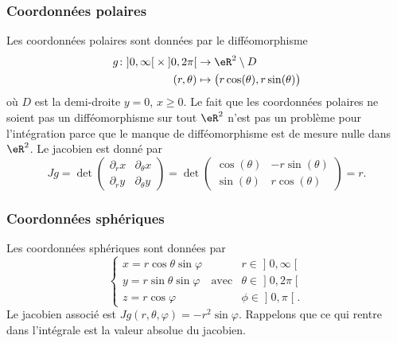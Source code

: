 \subsubsection{Coordonnées polaires}

Les coordonnées polaires sont données par le difféomorphisme
\begin{equation}
	\begin{aligned}
		g\colon \mathopen]0,\infty\mathclose[\times\mathopen]0,2\pi\mathclose[ & \to\eR^2\setminus D                             \\
		(r,\theta)                                                             & \mapsto \big( r\cos(\theta),r\sin(\theta) \big)
	\end{aligned}
\end{equation}
où $D$ est la demi-droite $y=0$, $x\geq 0$. Le fait que les coordonnées polaires ne soient pas un difféomorphisme sur tout $\eR^2$ n'est pas un problème pour l'intégration parce que le manque de difféomorphisme est de mesure nulle dans $\eR^2$. Le jacobien est donné par
\begin{equation}
	Jg=\det\begin{pmatrix}
		\partial_rx & \partial_{\theta}x \\
		\partial_ry & \partial_{\theta}y
	\end{pmatrix}=\det\begin{pmatrix}
		\cos(\theta) & -r\sin(\theta) \\
		\sin(\theta) & r\cos(\theta)
	\end{pmatrix}=r.
\end{equation}

\subsubsection{Coordonnées sphériques}
\label{SubSubCoordSpJxhMwm}

Les coordonnées sphériques sont données par
\begin{equation}		\label{OMEqChmVarSpherique}
	\left\{
	\begin{array}{lllll}
		x=r\cos\theta\sin\varphi &             & r\in\mathopen] 0 , \infty \mathclose[    \\
		y=r\sin\theta\sin\varphi & \text{avec} & \theta\in\mathopen] 0 , 2\pi \mathclose[ \\
		z=r\cos\varphi           &             & \phi\in\mathopen] 0 , \pi \mathclose[.
	\end{array}
	\right.
\end{equation}
Le jacobien associé est $Jg(r,\theta,\varphi)=-r^2\sin\varphi$. Rappelons que ce qui rentre dans l'intégrale est la valeur absolue du jacobien.

